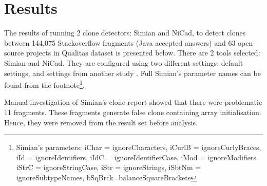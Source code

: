 \documentclass{sig-alternate-05-2015}
\begin{document}
\section{Results}
The results of running 2 clone detectors: Simian and NiCad, to detect clones between 144,075 Stackoverflow fragments (Java accepted answers) and 63 open-source projects in Qualitas dataset is presented below. There are 2 tools selected: Simian and NiCad. They are configured using two different settings: default settings, and settings from another study \cite{Wang2013}. Full Simian's parameter names can be found from the footnote\footnote{Simian's parameters: iChar = ignoreCharacters, iCurlB = ignoreCurlyBraces, iId = ignoreIdentifiers, iIdC = ignoreIdentifierCase, iMod = ignoreModifiers \newline iStrC = ignoreStringCase, iStr = ignoreStrings, iSbtNm = ignoreSubtypeNames, bSqBrck=balanceSquareBrackets}. 

Manual investigation of Simian's clone report showed that there were problematic 11 fragments. These fragments generate false clone containing array initialisation. Hence, they were removed from the result set before analysis.
\end{document}
